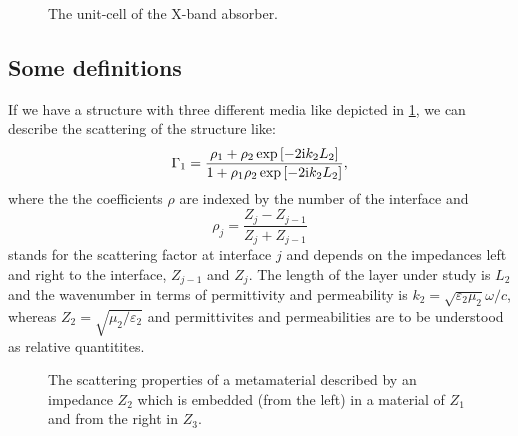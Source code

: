 \begin{figure}
\caption{The unit-cell of the X-band absorber.}
\end{figure}


\subsection{Some definitions}

If we have a structure with three different media like depicted in \cref{fig:stacked_structure}, we can describe the scattering of the structure like:
\begin{equation}
\Gamma_1 = \frac{\rho_1+\rho_2 \exp\left[-2\mathrm{i} k_2 L_2\right]}
{1+\rho_1\rho_2 \exp\left[-2\mathrm{i} k_2 L_2\right]},
\label{eqn:2layerGamma}
\end{equation}
where the the coefficients $\rho$ are indexed by the number of the interface and 
\begin{equation}
\rho_j = \frac{Z_j - Z_{j-1} }{Z_j + Z_{j-1} }
\label{eqn:rho}
\end{equation}
stands for the scattering factor at interface $j$ and depends on the impedances left and right to the interface, 
$Z_{j-1}$ and $Z_j$. The length of the layer under study is $L_2$ and the wavenumber in terms of permittivity 
and permeability is $k_2=\sqrt{\varepsilon_2\mu_2} \omega/c$, whereas $Z_2=\sqrt{\mu_2/\varepsilon_2}$ and permittivites and permeabilities are to be understood as relative quantitites.


\begin{figure}
\centering
{}
\caption{The scattering properties of a metamaterial described by an impedance $Z_2$ which is embedded (from the left) in a material of $Z_1$ and from the right in $Z_3$.}
\label{fig:stacked_structure}
\end{figure}

